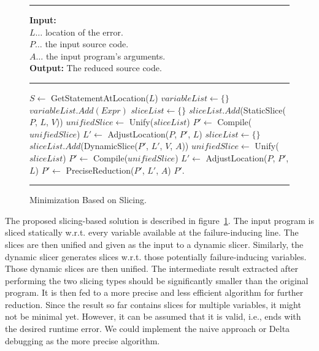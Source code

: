 \begin{figure}[h]
	\hrule height.8pt depth0pt \kern2pt
	\textbf{Input:} \\
	\hspace*{\algorithmicindent} $L \ldots$ location of the error. \\
	\hspace*{\algorithmicindent} $P \ldots$ the input source code. \\
	\hspace*{\algorithmicindent} $A \ldots$ the input program's arguments. \\
	\textbf{Output:} The reduced source code. 
	\hrule height.8pt depth0pt \kern2pt
	\begin{algorithmic}[1]
		\State $S \leftarrow$ GetStatementAtLocation($L$)
		\State $variableList \leftarrow \{\}$
				\State $variableList.Add(Expr)$
			\EndIf
		\EndFor
		\State $sliceList \leftarrow \{\}$
			\State $sliceList.Add$(StaticSlice($P$, $L$, $V$))
		\EndFor
		\State $unifiedSlice \leftarrow$ Unify($sliceList$)
		\State $P' \leftarrow$ Compile($unifiedSlice$)
		\State $L' \leftarrow$ AdjustLocation($P$, $P'$, $L$)
		\State $sliceList \leftarrow \{\}$
			\State $sliceList.Add$(DynamicSlice($P'$, $L'$, $V$, $A$))
		\EndFor
		\State $unifiedSlice \leftarrow$ Unify($sliceList$)
		\State $P' \leftarrow$ Compile($unifiedSlice$)
		\State $L' \leftarrow$ AdjustLocation($P$, $P'$, $L$)
		\State $P' \leftarrow$ PreciseReduction($P'$, $L'$, $A$)
		\State \Return $P'$.
	\end{algorithmic} 
	\hrule height.8pt depth0pt \kern2pt
	\caption{Minimization Based on Slicing.} 
	\label{alg:slicing}
\end{figure}

The proposed slicing-based solution is described in figure~\ref{alg:slicing}.
The input program is sliced statically w.r.t.
every variable available at the failure-inducing line.
The slices are then unified and given as the input to a dynamic slicer.
Similarly, the dynamic slicer generates slices w.r.t.
those potentially failure-inducing variables.
Those dynamic slices are then unified.
The intermediate result extracted after performing the two slicing types 
should be significantly smaller than the original program.
It is then fed to a more precise and less efficient algorithm for further 
reduction.
Since the result so far contains slices for multiple variables, it might not 
be minimal yet.
However, it can be assumed that it is valid, i.e., ends with the desired 
runtime error.
We could implement the naive approach or Delta debugging as the more 
precise algorithm.

